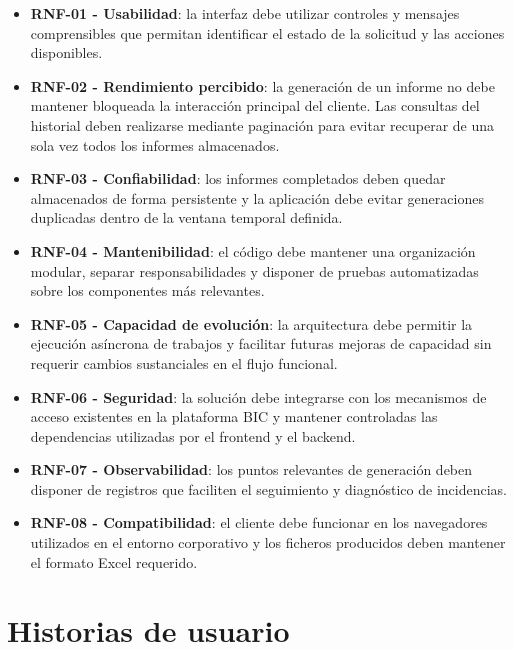 \documentclass[11pt,a4paper,titlepage,oneside]{report}
\begin{document}
\begin{itemize}

    \item \textbf{RNF-01 - Usabilidad}: la interfaz debe utilizar controles y
    mensajes comprensibles que permitan identificar el estado de la solicitud
    y las acciones disponibles.

    \item \textbf{RNF-02 - Rendimiento percibido}: la generación de un informe
    no debe mantener bloqueada la interacción principal del cliente. Las
    consultas del historial deben realizarse mediante paginación para evitar
    recuperar de una sola vez todos los informes almacenados.

    \item \textbf{RNF-03 - Confiabilidad}: los informes completados deben quedar
    almacenados de forma persistente y la aplicación debe evitar generaciones
    duplicadas dentro de la ventana temporal definida.

    \item \textbf{RNF-04 - Mantenibilidad}: el código debe mantener una
    organización modular, separar responsabilidades y disponer de pruebas
    automatizadas sobre los componentes más relevantes.

    \item \textbf{RNF-05 - Capacidad de evolución}: la arquitectura debe
    permitir la ejecución asíncrona de trabajos y facilitar futuras mejoras de
    capacidad sin requerir cambios sustanciales en el flujo funcional.

    \item \textbf{RNF-06 - Seguridad}: la solución debe integrarse con los
    mecanismos de acceso existentes en la plataforma BIC y mantener controladas
    las dependencias utilizadas por el frontend y el backend.

    \item \textbf{RNF-07 - Observabilidad}: los puntos relevantes de generación
    deben disponer de registros que faciliten el seguimiento y diagnóstico de
    incidencias.

    \item \textbf{RNF-08 - Compatibilidad}: el cliente debe funcionar en los
    navegadores utilizados en el entorno corporativo y los ficheros producidos
    deben mantener el formato Excel requerido.

\end{itemize}

\section{Historias de usuario}
\end{document}
